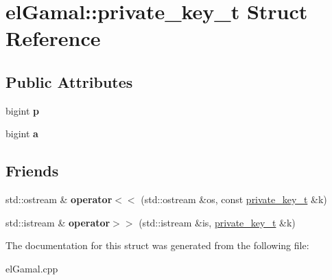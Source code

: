 \hypertarget{structelGamal_1_1private__key__t}{}\section{el\+Gamal\+:\+:private\+\_\+key\+\_\+t Struct Reference}
\label{structelGamal_1_1private__key__t}
\subsection*{Public Attributes}
\begin{DoxyCompactItemize}
\item 
\mbox{\label{structelGamal_1_1private__key__t_a9df42cc4041316be72eb435941933ffc}} 
bigint {\bfseries p}
\item 
\mbox{\label{structelGamal_1_1private__key__t_a0e3d2e173ce62a47bf3adf23fe6de6ff}} 
bigint {\bfseries a}
\end{DoxyCompactItemize}
\subsection*{Friends}
\begin{DoxyCompactItemize}
\item 
\mbox{\label{structelGamal_1_1private__key__t_afbe5e9a31935a7144b08a2e4648dda18}} 
std\+::ostream \& {\bfseries operator$<$$<$} (std\+::ostream \&os, const \mbox{\hyperlink{structelGamal_1_1private__key__t}{private\+\_\+key\+\_\+t}} \&k)
\item 
\mbox{\label{structelGamal_1_1private__key__t_a43107ca223fbc64064216565f925e6f3}} 
std\+::istream \& {\bfseries operator$>$$>$} (std\+::istream \&is, \mbox{\hyperlink{structelGamal_1_1private__key__t}{private\+\_\+key\+\_\+t}} \&k)
\end{DoxyCompactItemize}


The documentation for this struct was generated from the following file\+:\begin{DoxyCompactItemize}
\item 
el\+Gamal.\+cpp\end{DoxyCompactItemize}
